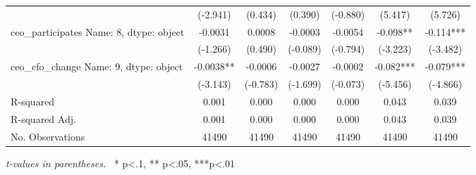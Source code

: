 \begin{table}[ht]
{{\begin{tabular}{lcccccc}
                            & (-2.941) & (0.434) & (0.390) & (-0.880) & (5.417) & (5.726) \\
        ceo\_participates
Name: 8, dtype: object & -0.0031 & 0.0008 & -0.0003 & -0.0054 & -0.098** & -0.114*** \\
                            & (-1.266) & (0.490) & (-0.089) & (-0.794) & (-3.223) & (-3.482) \\
        ceo\_cfo\_change
Name: 9, dtype: object & -0.0038** & -0.0006 & -0.0027 & -0.0002 & -0.082*** & -0.079*** \\
                            & (-3.143) & (-0.783) & (-1.699) & (-0.073) & (-5.456) & (-4.866) \\
\hline
R-squared & 0.001 & 0.000 & 0.000 & 0.000 & 0.043 & 0.039 \\
R-squared Adj. & 0.001 & 0.000 & 0.000 & 0.000 & 0.043 & 0.039 \\
No. Observations & 41490 & 41490 & 41490 & 41490 & 41490 & 41490 \\

    \hline
    \end{tabular}}
    }
    \bigskip
    \textit{t-values in parentheses.} \ 
    * p<.1, ** p<.05, ***p<.01
\end{table}
